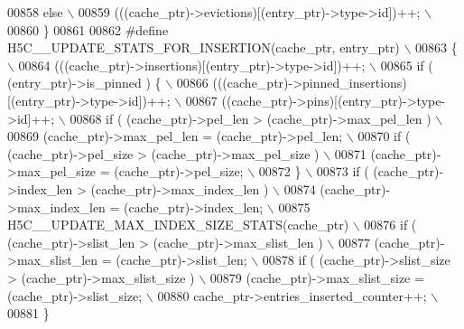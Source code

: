 \begin{DoxyCode}
00858 \textcolor{preprocessor}{    else                                                                     \(\backslash\)}
00859 \textcolor{preprocessor}{        (((cache\_ptr)->evictions)[(entry\_ptr)->type->id])++;                 \(\backslash\)}
00860 \textcolor{preprocessor}{\}}
00861 
00862 \textcolor{preprocessor}{#define H5C\_\_UPDATE\_STATS\_FOR\_INSERTION(cache\_ptr, entry\_ptr)        \(\backslash\)}
00863 \textcolor{preprocessor}{\{                                                                    \(\backslash\)}
00864 \textcolor{preprocessor}{    (((cache\_ptr)->insertions)[(entry\_ptr)->type->id])++;            \(\backslash\)}
00865 \textcolor{preprocessor}{    if ( (entry\_ptr)->is\_pinned ) \{                                  \(\backslash\)}
00866 \textcolor{preprocessor}{        (((cache\_ptr)->pinned\_insertions)[(entry\_ptr)->type->id])++; \(\backslash\)}
00867 \textcolor{preprocessor}{        ((cache\_ptr)->pins)[(entry\_ptr)->type->id]++;                \(\backslash\)}
00868 \textcolor{preprocessor}{        if ( (cache\_ptr)->pel\_len > (cache\_ptr)->max\_pel\_len )       \(\backslash\)}
00869 \textcolor{preprocessor}{            (cache\_ptr)->max\_pel\_len = (cache\_ptr)->pel\_len;         \(\backslash\)}
00870 \textcolor{preprocessor}{        if ( (cache\_ptr)->pel\_size > (cache\_ptr)->max\_pel\_size )     \(\backslash\)}
00871 \textcolor{preprocessor}{            (cache\_ptr)->max\_pel\_size = (cache\_ptr)->pel\_size;       \(\backslash\)}
00872 \textcolor{preprocessor}{    \}                                                                \(\backslash\)}
00873 \textcolor{preprocessor}{    if ( (cache\_ptr)->index\_len > (cache\_ptr)->max\_index\_len )       \(\backslash\)}
00874 \textcolor{preprocessor}{        (cache\_ptr)->max\_index\_len = (cache\_ptr)->index\_len;         \(\backslash\)}
00875 \textcolor{preprocessor}{    H5C\_\_UPDATE\_MAX\_INDEX\_SIZE\_STATS(cache\_ptr)                      \(\backslash\)}
00876 \textcolor{preprocessor}{    if ( (cache\_ptr)->slist\_len > (cache\_ptr)->max\_slist\_len )       \(\backslash\)}
00877 \textcolor{preprocessor}{        (cache\_ptr)->max\_slist\_len = (cache\_ptr)->slist\_len;         \(\backslash\)}
00878 \textcolor{preprocessor}{    if ( (cache\_ptr)->slist\_size > (cache\_ptr)->max\_slist\_size )     \(\backslash\)}
00879 \textcolor{preprocessor}{        (cache\_ptr)->max\_slist\_size = (cache\_ptr)->slist\_size;       \(\backslash\)}
00880 \textcolor{preprocessor}{    cache\_ptr->entries\_inserted\_counter++;                           \(\backslash\)}
00881 \textcolor{preprocessor}{\}}

\end{DoxyCode}
